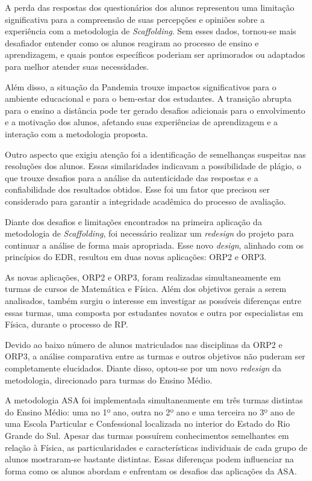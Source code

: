 A perda das respostas dos questionários dos alunos representou uma limitação significativa para a compreensão de suas percepções e opiniões sobre a experiência com a metodologia de \textit{Scaffolding}. Sem esses dados, tornou-se mais desafiador entender como os alunos reagiram ao processo de ensino e aprendizagem, e quais pontos específicos poderiam ser aprimorados ou adaptados para melhor atender suas necessidades.

Além disso, a situação da Pandemia trouxe impactos significativos para o ambiente educacional e para o bem-estar dos estudantes. A transição abrupta para o ensino a distância pode ter gerado desafios adicionais para o envolvimento e a motivação dos alunos, afetando suas experiências de aprendizagem e a interação com a metodologia proposta.

Outro aspecto que exigiu atenção foi a identificação de semelhanças suspeitas nas resoluções dos alunos. Essas similaridades indicavam a possibilidade de plágio, o que trouxe desafios para a análise da autenticidade das respostas e a confiabilidade dos resultados obtidos. Esse foi um fator que precisou ser considerado para garantir a integridade acadêmica do processo de avaliação. 

Diante dos desafios e limitações encontrados na primeira aplicação da metodologia de \textit{Scaffolding}, foi necessário realizar um \textit{redesign} do projeto para continuar a análise de forma mais apropriada. Esse novo \textit{design}, alinhado com os princípios do EDR, resultou em duas novas aplicações: ORP2 e ORP3. 

As novas aplicações, ORP2 e ORP3, foram realizadas simultaneamente em turmas de cursos de Matemática e Física. Além dos objetivos gerais a serem analisados, também surgiu o interesse em investigar as possíveis diferenças entre essas turmas, uma composta por estudantes novatos e outra por especialistas em Física, durante o processo de RP.

Devido ao baixo número de alunos matriculados nas disciplinas da ORP2 e ORP3, a análise comparativa entre as turmas e outros objetivos não puderam ser completamente elucidados. Diante disso, optou-se por um novo \textit{redesign} da metodologia, direcionado para turmas do Ensino Médio. 

A metodologia ASA foi implementada simultaneamente em três turmas distintas do Ensino Médio: uma no 1º ano, outra no 2º ano e uma terceira no 3º ano de uma Escola Particular e Confessional localizada no interior do Estado do Rio Grande do Sul. Apesar das turmas possuírem conhecimentos semelhantes em relação à Física, as particularidades e características individuais de cada grupo de alunos mostraram-se bastante distintas. Essas diferenças podem influenciar na forma como os alunos abordam e enfrentam os desafios das aplicações da ASA.

